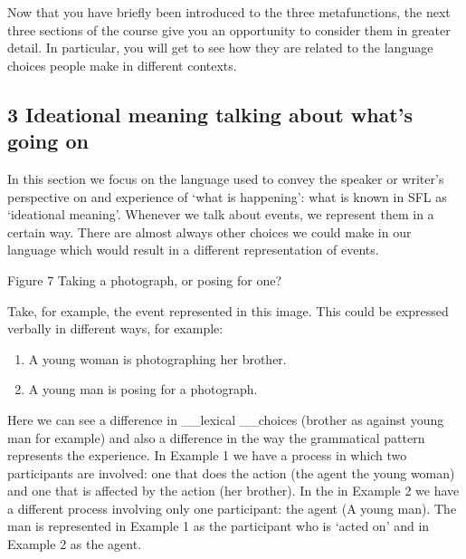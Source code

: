 \documentclass[letterpaper,10pt,english]{sphinxmanual}
\let\sphinxpxdimen\pdfpxdimen\else\newdimen\sphinxpxdimen
\begin{document}
Now that you have briefly been introduced to the three metafunctions, the next three sections of the course give you an opportunity to consider them in greater detail. In particular, you will get to see how they are related to the language choices people make in different contexts.


\subsection{3 Ideational meaning \textendash{} talking about what’s going on}
\label{\detokenize{content/session_00/Part_00_03:3-Ideational-meaning-_-talking-about-what_u2019s-going-on}}\label{\detokenize{content/session_00/Part_00_03::doc}}
In this section we focus on the language used to convey the speaker or writer’s perspective on and experience of ‘what is happening’: what is known in SFL as ‘ideational meaning’. Whenever we talk about events, we represent them in a certain way. There are almost always other choices we could make in our language which would result in a different representation of events.

\sphinxincludegraphics[width=342\sphinxpxdimen,height=246\sphinxpxdimen]{{e304_1_fig006cropped}.jpg}

Figure 7 Taking a photograph, or posing for one?

Take, for example, the event represented in this image. This could be expressed verbally in different ways, for example:
\begin{enumerate}
%
\item {} 
A young woman is photographing her brother.

\item {} 
A young man is posing for a photograph.

\end{enumerate}

Here we can see a difference in \_\_lexical \_\_choices (brother as against young man for example) and also a difference in the way the grammatical pattern represents the experience. In Example 1 we have a process in which two participants are involved: one that does the action (the agent \textendash{} the young woman) and one that is affected by the action (her brother). In the  in Example 2 we have a different process involving only one participant: the agent (A young man). The man is represented
in Example 1 as the participant who is ‘acted on’ and in Example 2 as the agent.
\end{document}
